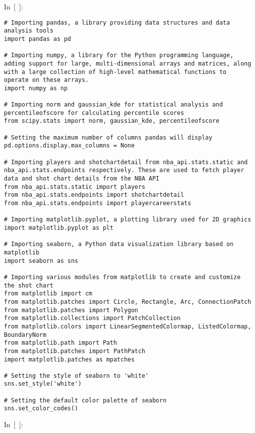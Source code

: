 In~{[}~{]}:

\begin{verbatim}
# Importing pandas, a library providing data structures and data analysis tools
import pandas as pd

# Importing numpy, a library for the Python programming language, adding support for large, multi-dimensional arrays and matrices, along with a large collection of high-level mathematical functions to operate on these arrays.
import numpy as np

# Importing norm and gaussian_kde for statistical analysis and percentileofscore for calculating percentile scores
from scipy.stats import norm, gaussian_kde, percentileofscore

# Setting the maximum number of columns pandas will display
pd.options.display.max_columns = None

# Importing players and shotchartdetail from nba_api.stats.static and nba_api.stats.endpoints respectively. These are used to fetch player data and shot chart details from the NBA API
from nba_api.stats.static import players
from nba_api.stats.endpoints import shotchartdetail
from nba_api.stats.endpoints import playercareerstats

# Importing matplotlib.pyplot, a plotting library used for 2D graphics
import matplotlib.pyplot as plt

# Importing seaborn, a Python data visualization library based on matplotlib
import seaborn as sns

# Importing various modules from matplotlib to create and customize the shot chart
from matplotlib import cm
from matplotlib.patches import Circle, Rectangle, Arc, ConnectionPatch
from matplotlib.patches import Polygon
from matplotlib.collections import PatchCollection
from matplotlib.colors import LinearSegmentedColormap, ListedColormap, BoundaryNorm
from matplotlib.path import Path
from matplotlib.patches import PathPatch
import matplotlib.patches as mpatches

# Setting the style of seaborn to 'white'
sns.set_style('white')

# Setting the default color palette of seaborn
sns.set_color_codes()
\end{verbatim}

In~{[}~{]}:

